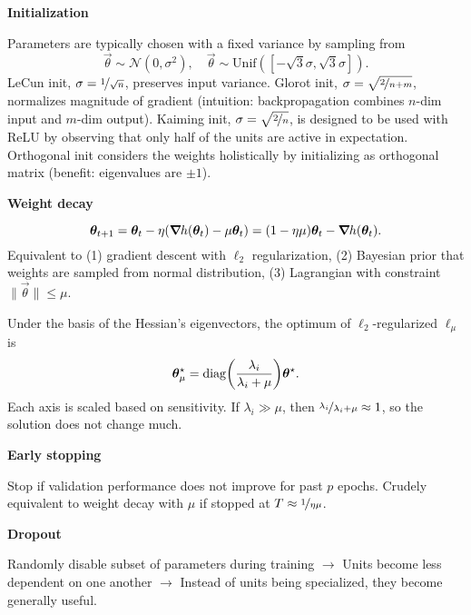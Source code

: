 \documentclass[10pt]{article}
\newenvironment{topic}[1]
{\textbf{\sffamily \colorbox{black}{\rlap{\textbf{\textcolor{white}{#1}}}\hspace{\linewidth}\hspace{-2\fboxsep}}}}
{}
\newenvironment{subtopic}[1]
{\begin{center}\textbf{\sffamily #1}\end{center}}
{}
\begin{document}
\begin{multicols*}{3}
\begin{topic}{Tricks of the trade}
        \begin{subtopic}{Initialization}
            Parameters are typically chosen with a fixed variance by sampling from \[
                \vec{\theta} \sim \mathcal{N}(0, \sigma^2), \quad \vec{\theta} \sim \mathrm{Unif}([-\sqrt{3}\sigma,\sqrt{3}\sigma]).
            \]
            LeCun init, $\sigma = \nicefrac{1}{\sqrt{n}}$, preserves input variance. Glorot init, $\sigma =
                \sqrt{\nicefrac{2}{n+m}}$, normalizes magnitude of gradient (intuition: backpropagation combines
            $n$-dim input and $m$-dim output). Kaiming init, $\sigma = \sqrt{\nicefrac{2}{n}}$, is designed to
            be used with ReLU by observing that only half of the units are active in expectation. Orthogonal
            init considers the weights holistically by initializing as orthogonal matrix (benefit: eigenvalues
            are $\pm 1$).
        \end{subtopic}

        \begin{subtopic}{Weight decay}
            \[
                \bm{\theta}_{t+1} = \bm{\theta}_t - \eta (\bm{\nabla}_{\! } h(\bm{\theta}_t) - \mu \bm{\theta}_t) = (1-\eta \mu) \bm{\theta}_t - \bm{\nabla}_{\! } h(\bm{\theta}_t).
            \]
            Equivalent to (1) gradient descent with $\ell_2$ regularization, (2) Bayesian prior that weights
            are sampled from normal distribution, (3) Lagrangian with constraint $\| \vec{\theta} \| \leq \mu$.

            Under the basis of the Hessian's eigenvectors, the optimum of $\ell_2$-regularized $\ell_{\mu}$ is \[
                \vec{\theta}_\mu^\star = \mathrm{diag}\lft( \frac{\lambda_i}{\lambda_i + \mu} \rgt) \vec{\theta}^\star.
            \]
            Each axis is scaled based on sensitivity. If $\lambda_i \gg \mu$, then
            $\nicefrac{\lambda_i}{\lambda_i + \mu} \approx 1$, so the solution does not change much.
        \end{subtopic}

        \begin{subtopic}{Early stopping}
            Stop if validation performance does not improve for past $p$ epochs. Crudely
            equivalent to weight decay with $\mu$ if stopped at $T \approx \nicefrac{1}{\eta \mu}$.
        \end{subtopic}

        \begin{subtopic}{Dropout}
            Randomly disable subset of parameters during training $\to$ Units become less dependent
            on one another $\to$ Instead of units being specialized, they become generally useful.


\end{subtopic}
\end{topic}
\end{multicols*}
\end{document}
